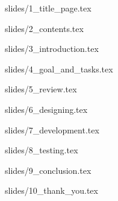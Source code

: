 \documentclass{beamer}
\begin{document}
{slides/1_title_page.tex}

{slides/2_contents.tex}

{slides/3_introduction.tex}

{slides/4_goal_and_tasks.tex}

{slides/5_review.tex}

{slides/6_designing.tex}

{slides/7_development.tex}

{slides/8_testing.tex}

{slides/9_conclusion.tex}

{slides/10_thank_you.tex}
\end{document}
